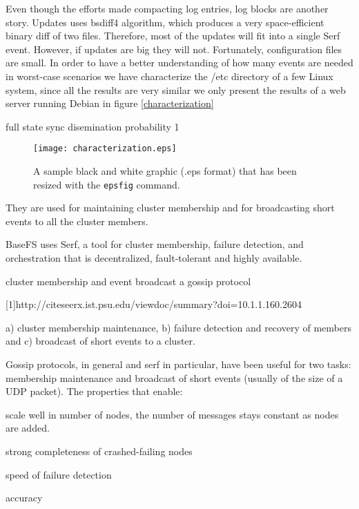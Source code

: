 \documentclass{sig-alternate}
\begin{document}
Even though the efforts made compacting log entries, log blocks are another story. Updates uses bsdiff4 \link algorithm, which produces a very space-efficient binary diff of two files. Therefore, most of the updates will fit into a single Serf event. However, if updates are big they will not. Fortunately, configuration files are small. In order to have a better understanding of how many events are needed in worst-case scenarios we have characterize the /etc directory of a few Linux system, since all the results are very similar we only present the results of a web server running Debian in figure \ref{characterization}

full state sync disemination probability 1

\begin{figure}
\centering
\texttt{[image: characterization.eps]}
\caption{A sample black and white graphic (.eps format)
that has been resized with the \texttt{epsfig} command.}
\end{figure}





They are used for maintaining cluster membership and for broadcasting short events to all the cluster members.

BaseFS uses Serf, a tool for cluster membership, failure detection, and orchestration that is decentralized, fault-tolerant and highly available.


cluster membership and event broadcast a gossip protocol

[1]http://citeseerx.ist.psu.edu/viewdoc/summary?doi=10.1.1.160.2604

a) cluster membership maintenance, b) failure detection and recovery of members and c) broadcast of short events to a cluster.



Gossip protocols, in general and serf in particular, have been useful for two tasks: membership maintenance and broadcast of short events (usually of the size of a UDP packet). The properties that enable:

\item scale well in number of nodes, the number of messages stays constant as nodes are added. 
\item strong completeness of crashed-failing nodes
\item speed of failure detection
\item accuracy
\end{document}

